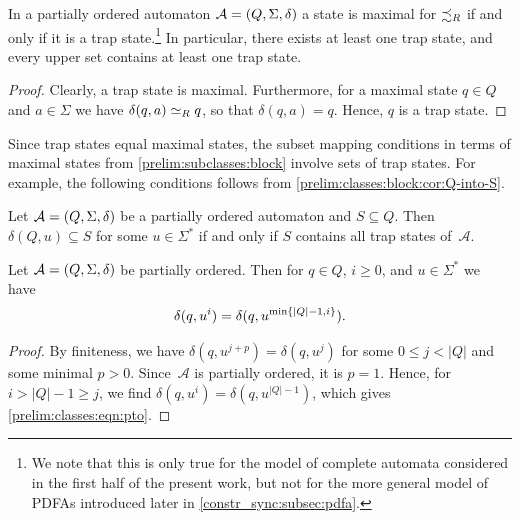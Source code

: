 \begin{proposition} \label{prelim:classes:pto:prop:max-equal-trap}
		\label{prelim:fact:pto_trap_iff_maximal} 
	In a partially ordered automaton $\mathcal A = (Q, \Sigma, \delta)$ 
	a state is maximal for $\precsim_R$
	if and only if it is a trap state.\footnote{We note that this is only true for the model of complete automata considered in the first half of the present work, but not for the more general model of PDFAs introduced later in \cref{constr_sync:subsec:pdfa}.} In particular,
	there exists at least one trap state, and every upper set contains at least one trap state.
\end{proposition}
\begin{proof}
	Clearly, a trap state is maximal. Furthermore, for a maximal state $q \in Q$ and $a \in \Sigma$ we have $\delta(q, a) \simeq_R q$,
	so that $\delta(q, a) = q$. Hence, $q$ is a trap state.
\end{proof}

Since trap states equal maximal states, the subset mapping conditions in terms of maximal states from 
\cref{prelim:subclasses:block} involve sets of trap states. For example, the following conditions follows from \cref{prelim:classes:block:cor:Q-into-S}.

\begin{proposition} \label{cor:pto-trap-states}
	Let $\mathcal A = (Q, \Sigma, \delta)$ be a partially ordered automaton
	and $S \subseteq Q$.
	Then $\delta(Q, u) \subseteq S$ for some $u \in \Sigma^*$
	if and only if  $S$ contains all trap states of~$\mathcal A$.  
\end{proposition}

\begin{proposition}
	Let $\mathcal A = (Q, \Sigma, \delta)$ be partially ordered.
	Then for $q \in Q$, $i \ge 0$, 
	and $u \in \Sigma^*$ we have
	\begin{equation}\label{prelim:classes:eqn:pto}
		\delta(q,u^i) = \delta(q,u^{\min\{|Q| - 1, i\}}).
	\end{equation}
\end{proposition}
\begin{proof}
	By finiteness, we have $\delta(q, u^{j + p}) = \delta(q, u^j)$
	for some $0 \le j < |Q|$ and some minimal $p > 0$.
	Since~$\mathcal A$ is partially ordered, it is $p = 1$.
	Hence, for $i > |Q| - 1 \ge j$,
	we find $\delta(q, u^i) = \delta(q, u^{|Q| - 1})$, which gives \cref{prelim:classes:eqn:pto}.
\end{proof}

